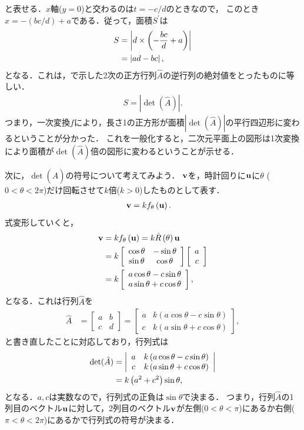 と表せる．$x$軸($y=0$)と交わるのは$t=-c/d$のときなので，
このとき$x=-(bc/d)+a$である．従って，面積$S^{\prime}$は
\begin{align}
S & =\left|d\times\left(-\dfrac{bc}{d}+a\right)\right|\notag\\
 & =\left|ad-bc\right|, 
\end{align}
となる．これは，で示した2次の正方行列$\hat{A}$の逆行列の絶対値をとったものに等しい．
\begin{align}
 S = \left|\det(\hat{A})\right|.
\end{align}
%
つまり，一次変換$f$により，長さ1の正方形が面積$\left|\det(\hat{A})\right|$の平行四辺形に変わるということが分かった．
これを一般化すると，二次元平面上の図形は1次変換により面積が$\det(\hat{A})$倍の図形に変わるということが示せる．

%
次に，$\det(\hat{A})$の符号について考えてみよう．
${\bf v}$を，時計回りに${\bf u}$に$\theta$ ($0<\theta < 2\pi$)だけ回転させて$k$倍($k>0$)したものとして表す．
\begin{align}
{\bf v} & =kf_{\theta}\left({\bf u}\right).
\end{align}
式変形していくと，
\begin{align}
{\bf v} & =kf_{\theta}\left({\bf u}\right)
 =k\hat{R}\left(\theta\right){\bf u}\notag\\
 & =k\left[\begin{array}{cc}
\cos\theta & -\sin\theta\\
\sin\theta & \cos\theta
\end{array}\right]\left[\begin{array}{c}
a\\
c
\end{array}\right]\notag\\
 & =k\left[\begin{array}{c}
a\cos\theta-c\sin\theta\\
a\sin\theta+c\cos\theta
\end{array}\right],
\end{align}
となる．これは行列$\hat{A}$を
\begin{align}
\hat{A} & =\left[\begin{array}{cc}
a & b\\
c & d
\end{array}\right]
 =\left[\begin{array}{cc}
a & k\left(a\cos\theta-c\sin\theta\right)\\
c & k\left(a\sin\theta+c\cos\theta\right)
\end{array}\right], 
\end{align}
と書き直したことに対応しており，行列式は
\begin{align}
\det(\hat{A}) & =\left|\begin{array}{cc}
a & k\left(a\cos\theta-c\sin\theta\right)\\
c & k\left(a\sin\theta+c\cos\theta\right)
\end{array}\right|\notag\\
 & =k\left(a^{2}+c^{2}\right)\sin\theta, 
\end{align}
となる．$a,c$は実数なので，行列式の正負は$\sin \theta$で決まる．
つまり，行列$\hat{A}$の1列目のベクトル${\bf u}$に対して，2列目のベクトル${\bf v}$が左側($0 <\theta < \pi$)にあるか右側($\pi < \theta < 2\pi$)にあるかで行列式の符号が決まる．
%

